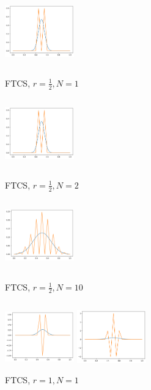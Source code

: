 \documentclass{ctexart}
\begin{document}
\begin{figure}[htbp]
	\begin{minipage}{5cm}
		\centering
		\includegraphics[width = 3cm, height = 3cm]{2-3-1.png}
		\caption{FTCS, $r=\frac 12,N=1$}
		\label{ftcs1}
	\end{minipage}
	\begin{minipage}{5cm}
		\centering
		\includegraphics[width = 3cm, height = 3cm]{2-3-2.png}
		\caption{FTCS, $r=\frac 12,N=2$}
		\label{ftcs2}
	\end{minipage}
	\begin{minipage}{5cm}
		\centering
		\includegraphics[width = 3cm, height = 3cm]{2-3-3.png}
		\caption{FTCS, $r=\frac 12,N=10$}
		\label{ftcs3}
	\end{minipage}
	\begin{minipage}{5cm}
		\centering
		\includegraphics[width = 3cm, height = 3cm]{2-4-1.png}
		\caption{FTCS, $r=1,N=1$}
		\label{ftcs4}
	\end{minipage}
	\begin{minipage}{5cm}
		\centering
		\includegraphics[width = 3cm, height = 3cm]{2-4-2.png}

\end{minipage}
\end{figure}
\end{document}
